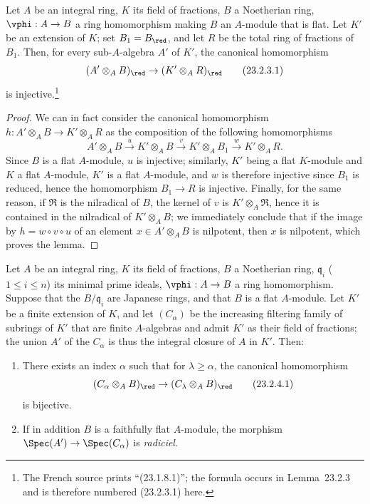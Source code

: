 \begin{lemma}[23.2.3]
\label{0.23.2.3}
Let $A$ be an integral ring, $K$ its field of fractions, $B$ a Noetherian ring, $\vphi:A\to B$ a ring homomorphism making $B$ an $A$-module that is flat.
Let $K'$ be an extension of $K$; set $B_1=B_\red$, and let $R$ be the total ring of fractions of $B_1$.
Then, for every sub-$A$-algebra $A'$ of $K'$, the canonical homomorphism
\[
\label{0.23.2.3.1}
  (A'\otimes_A B)_\red\to(K'\otimes_A R)_\red
  \tag{23.2.3.1}
\]
is injective.\footnote{The French source prints ``(23.1.8.1)''; the formula occurs in Lemma~23.2.3 and is therefore numbered (23.2.3.1) here.}
\end{lemma}

\begin{proof}
We can in fact consider the canonical homomorphism $h:A'\otimes_A B\to K'\otimes_A R$ as the composition of the following homomorphisms
\[
  A'\otimes_A B\xrightarrow{u}K'\otimes_A B\xrightarrow{v}K'\otimes_A B_1\xrightarrow{w}K'\otimes_A R.
\]
Since $B$ is a flat $A$-module, $u$ is injective; similarly, $K'$ being a flat $K$-module and $K$ a flat $A$-module, $K'$ is a flat $A$-module, and $w$ is therefore injective since $B_1$ is reduced, hence the homomorphism $B_1\to R$ is injective.
Finally, for the same reason, if $\mathfrak{R}$ is
the nilradical of $B$, the kernel of $v$ is $K'\otimes_A\mathfrak{R}$, hence it is contained in the nilradical of $K'\otimes_A B$; we immediately conclude that if the image by $h=w\circ v\circ u$ of an element $x\in A'\otimes_A B$ is nilpotent, then $x$ is nilpotent, which proves the lemma.
\end{proof}

\begin{proposition}[23.2.4]
\label{0.23.2.4}
Let $A$ be an integral ring, $K$ its field of fractions, $B$ a Noetherian ring, $\mathfrak{q}_i$ ($1\leq i\leq n$) its minimal prime ideals, $\vphi:A\to B$ a ring homomorphism.
Suppose that the $B/\mathfrak{q}_i$ are Japanese rings, and that $B$ is a flat $A$-module.
Let $K'$ be a finite extension of $K$, and let $(C_\alpha)$ be the increasing filtering family of subrings of $K'$ that are finite $A$-algebras and admit $K'$ as their field of fractions; the union $A'$ of the $C_\alpha$ is thus the integral closure of $A$ in $K'$.
Then:
\begin{enumerate}
  \item[{\rm(i)}] There exists an index $\alpha$ such that for $\lambda\geq\alpha$, the canonical homomorphism
    \[
    \label{0.23.2.4.1}
      (C_\alpha\otimes_A B)_\red\to(C_\lambda\otimes_A B)_\red
      \tag{23.2.4.1}
    \]
    is bijective.
  \item[{\rm(ii)}] If in addition $B$ is a faithfully flat $A$-module, the morphism $\Spec(A')\to\Spec(C_\alpha)$ is \emph{radiciel}.
\end{enumerate}
\end{proposition}

